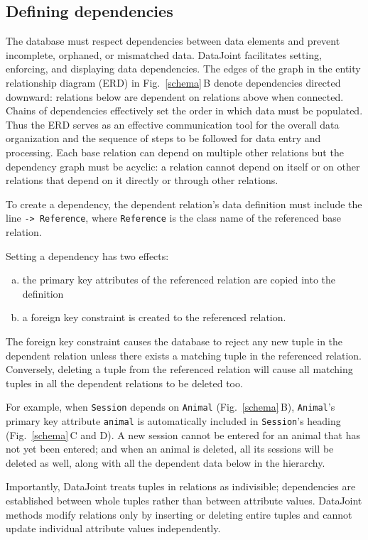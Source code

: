 \documentclass[10pt,letterpaper]{article}
\newcommand{\matlab}[1]{\texttt{#1}}
\begin{document}
\subsection*{Defining dependencies}
The database must respect dependencies between data elements and prevent incomplete, orphaned, or mismatched data.
DataJoint facilitates setting, enforcing, and displaying data dependencies. 
The edges of the graph in the entity relationship diagram (ERD) in Fig.\ \ref{schema}\,B denote dependencies directed downward: relations below are dependent on relations above when connected.
Chains of dependencies effectively set the order in which  data must be populated. 
Thus the ERD serves as an effective communication tool for the overall data organization and the sequence of steps to be followed for data entry and  processing.
Each base relation can depend on multiple other relations but the dependency graph must be acyclic: a relation cannot depend on itself or on other relations that depend on it directly or through other relations.

To create a dependency, the dependent relation's data definition must include the line \matlab{-> Reference}, where \matlab{Reference} is the class name of the referenced base relation.

Setting a dependency has two effects:
\begin{enumerate}[(a)]
\item the primary key attributes of the referenced relation are copied into the definition 
\item a foreign key constraint is created to the referenced relation.
\end{enumerate}

The foreign key constraint causes the database to reject any new tuple in the dependent relation unless there exists a matching tuple in the referenced relation. 
Conversely, deleting a tuple from the referenced relation will cause all matching tuples in all the dependent relations to be deleted too.

For example, when \matlab{Session} depends on \matlab{Animal} (Fig.\ \ref{schema}\,B),
\matlab{Animal}'s primary key attribute {\tt animal} is automatically included in \matlab{Session}'s heading (Fig.\ \ref{schema}\,C and D). 
A new session cannot be entered for an animal that has not yet been entered;  and when an animal is deleted, all its sessions will be  deleted as well, along with all the dependent data below in the hierarchy.

Importantly, DataJoint treats tuples in relations as indivisible; dependencies are established between whole tuples rather than between attribute values.
DataJoint methods modify relations only by inserting or deleting entire tuples and cannot update individual attribute values independently.
\end{document}
